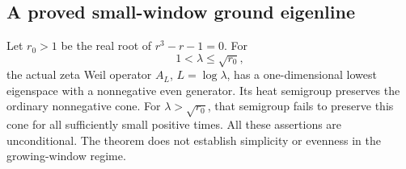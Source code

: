 \subsection{A proved small-window ground eigenline}

\begin{theorem}
\label{AC-S28}
Let \(r_0>1\) be the real root of \(r^3-r-1=0\).
For
\[
                 1<\lambda\leq\sqrt{r_0},
\]
the actual zeta Weil operator \(A_L\), \(L=\log\lambda\), has a
one-dimensional lowest eigenspace with a nonnegative even generator.
Its heat semigroup preserves the ordinary nonnegative cone.
For \(\lambda>\sqrt{r_0}\), that semigroup fails to preserve this
cone for all sufficiently small positive times.
All these assertions are unconditional.  The theorem does not
establish simplicity or evenness in the growing-window regime.
\end{theorem}
